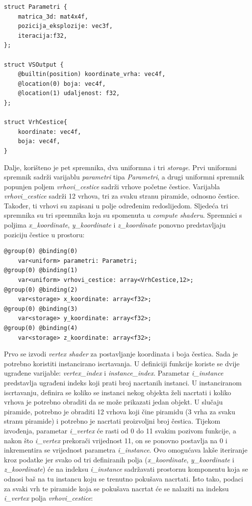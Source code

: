 \documentclass{foi}
\begin{document}
\begin{verbatim}
struct Parametri {
	matrica_3d: mat4x4f,
	pozicija_eksplozije: vec3f,
	iteracija:f32,
};

struct VSOutput {
	@builtin(position) koordinate_vrha: vec4f,
	@location(0) boja: vec4f,
	@location(1) udaljenost: f32,
};

struct VrhCestice{
	koordinate: vec4f,
	boja: vec4f,
}
\end{verbatim} 


Dalje, korišteno je pet spremnika, dva uniformna i tri \textit{storage}. Prvi uniformni spremnik sadrži varijablu \textit{parametri} tipa \textit{Parametri}, a drugi uniformni spremnik popunjen poljem \textit{vrhovi\_cestice} sadrži vrhove početne čestice. Varijabla \textit{vrhovi\_cestice} sadrži 12 vrhova, tri za svaku stranu piramide, odnosno čestice. Također, ti vrhovi su zapisani u polje određenim redoslijedom. Sljedeća tri spremnika su tri spremnika koja su spomenuta u \textit{compute shaderu}. Spremnici s poljima \textit{x\_koordinate}, \textit{y\_koordinate} i \textit{z\_koordinate} ponovno predstavljaju poziciju čestice u prostoru:

\begin{verbatim}
@group(0) @binding(0) 
	var<uniform> parametri: Parametri;
@group(0) @binding(1) 
	var<uniform> vrhovi_cestice: array<VrhCestice,12>;
@group(0) @binding(2) 
	var<storage> x_koordinate: array<f32>;
@group(0) @binding(3) 
	var<storage> y_koordinate: array<f32>;
@group(0) @binding(4)
	var<storage> z_koordinate: array<f32>;

\end{verbatim} 


Prvo se izvodi \textit{vertex shader} za postavljanje koordinata i boja čestica. Sada je potrebno koristiti instancirano iscrtavanja. U definiciji funkcije koriste se dvije ugrađene varijable: \textit{vertex\_index} i \textit{instance\_index}. Parametar \textit{i\_instance} predstavlja ugrađeni indeks koji prati broj nacrtanih instanci. U instanciranom iscrtavanju, definira se koliko se instanci nekog objekta želi nacrtati i koliko vrhova je potrebno obraditi da se može prikazati jedan objekt. U slučaju piramide, potrebno je obraditi 12 vrhova koji čine piramidu (3 vrha za svaku stranu piramide) i potrebno je nacrtati proizvoljni broj čestica. Tijekom izvođenja, parametar \textit{i\_vertex} će rasti od 0 do 11 svakim pozivom funkcije, a nakon što \textit{i\_vertex} prekorači vrijednost 11, on se ponovno postavlja na 0 i inkrementira se vrijednost parametra \textit{i\_instance}. Ovo omogućava lakše iteriranje kroz podatke jer svako od tri definiranih polja (\textit{x\_koordinate}, \textit{y\_koordinate} i \textit{z\_koordinate}) će na indeksu \textit{i\_instance} sadržavati prostornu komponentu koja se odnosi baš na tu instancu koju se trenutno pokušava nacrtati. Isto tako, podaci za svaki vrh te piramide koja se pokušava nacrtat će se nalaziti na indeksu \textit{i\_vertex} polja \textit{vrhovi\_cestice}:
\end{document}
